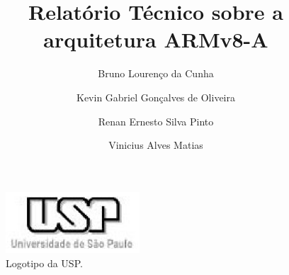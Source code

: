 \documentclass[12pt,a4paper,utf8, brazilian]{ppgsi}
\title{Relatório Técnico sobre a arquitetura ARMv8-A}
\author{Bruno Lourenço da Cunha\inst{1}
    \and Kevin Gabriel Gonçalves de Oliveira\inst{2}
    \and Renan Ernesto Silva Pinto\inst{3}
    \and Vinicius Alves Matias\inst{4}}
\begin{document}
\maketitle

\begin{figure}[H]
    \centering
    \includegraphics[width=5cm]{logo-USP.eps}
    \caption{Logotipo da USP.}
    \label{Fig:taxonomia}
\end{figure}
\end{document}

